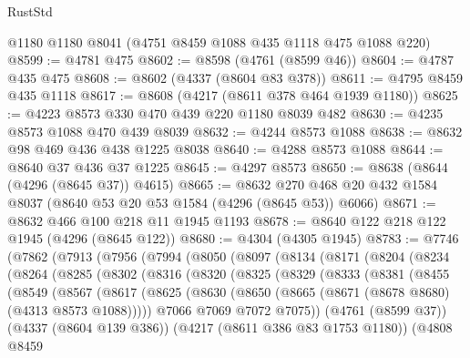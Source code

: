 \begin{lexlean}{RustStd}
\begin{coremodule}
    @1180
    @1180
    @8041
    (@4751 @8459 @1088 @435 @1118 @475 @1088 @220)
@8599 := @4781 @475
@8602 := @8598 (@4761 (@8599 @46))
@8604 := @4787 @435 @475
@8608 := @8602 (@4337 (@8604 @83 @378))
@8611 := @4795 @8459 @435 @1118
@8617 := @8608 (@4217 (@8611 @378 @464 @1939 @1180))
@8625 := @4223 @8573 @330 @470 @439 @220 @1180 @8039 @482
@8630 := @4235 @8573 @1088 @470 @439 @8039
@8632 := @4244 @8573 @1088
@8638 := @8632 @98 @469 @436 @438 @1225 @8038
@8640 := @4288 @8573 @1088
@8644 := @8640 @37 @436 @37 @1225
@8645 := @4297 @8573
@8650 := @8638 (@8644 (@4296 (@8645 @37)) @4615)
@8665 := @8632 @270 @468 @20 @432 @1584 @8037 (@8640 @53 @20 @53 @1584 (@4296 (@8645 @53)) @6066)
@8671 := @8632 @466 @100 @218 @11 @1945 @1193
@8678 := @8640 @122 @218 @122 @1945 (@4296 (@8645 @122))
@8680 := @4304 (@4305 @1945)
@8783 := @7746
    (@7862
      (@7913
        (@7956
          (@7994
            (@8050
              (@8097
                (@8134
                  (@8171
                    (@8204
                      (@8234
                        (@8264
                          (@8285
                            (@8302
                              (@8316
                                (@8320
                                  (@8325
                                    (@8329
                                      (@8333
                                        (@8381
                                          (@8455
                                            (@8549
                                              (@8567
                                                (@8617
                                                  (@8625
                                                    (@8630
                                                      (@8650
                                                        (@8665
                                                          (@8671
                                                            (@8678 @8680)
                                                            (@4313 @8573 @1088)))))
                                                    @7066
                                                    @7069
                                                    @7072
                                                    @7075))
                                                (@4761 (@8599 @37))
                                                (@4337 (@8604 @139 @386))
                                                (@4217 (@8611 @386 @83 @1753 @1180))
                                                (@4808
                                                  @8459

\end{coremodule}
\end{lexlean}
